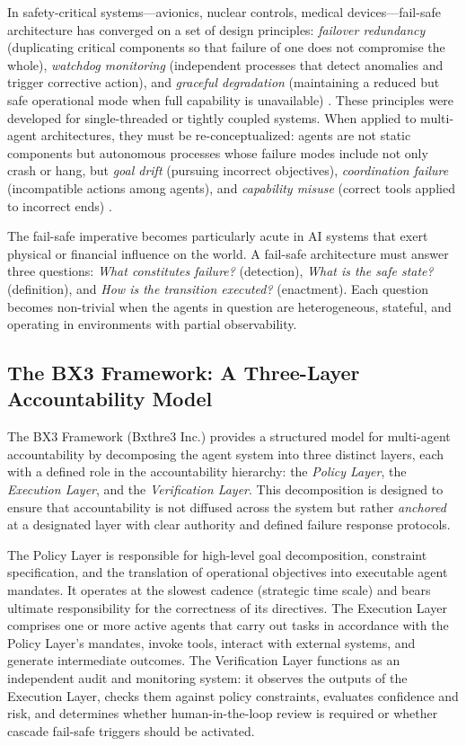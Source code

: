 In safety-critical systems—avionics, nuclear controls, medical devices—fail-safe architecture has converged on a set of design principles: \emph{failover redundancy} (duplicating critical components so that failure of one does not compromise the whole), \emph{watchdog monitoring} (independent processes that detect anomalies and trigger corrective action), and \emph{graceful degradation} (maintaining a reduced but safe operational mode when full capability is unavailable) \cite{wiener1948}. These principles were developed for single-threaded or tightly coupled systems. When applied to multi-agent architectures, they must be re-conceptualized: agents are not static components but autonomous processes whose failure modes include not only crash or hang, but \emph{goal drift} (pursuing incorrect objectives), \emph{coordination failure} (incompatible actions among agents), and \emph{capability misuse} (correct tools applied to incorrect ends) \cite{bansal2019}.

The fail-safe imperative becomes particularly acute in AI systems that exert physical or financial influence on the world. A fail-safe architecture must answer three questions: \emph{What constitutes failure?} (detection), \emph{What is the safe state?} (definition), and \emph{How is the transition executed?} (enactment). Each question becomes non-trivial when the agents in question are heterogeneous, stateful, and operating in environments with partial observability.

\subsection{The BX3 Framework: A Three-Layer Accountability Model}

The BX3 Framework (Bxthre3 Inc.) provides a structured model for multi-agent accountability by decomposing the agent system into three distinct layers, each with a defined role in the accountability hierarchy: the \emph{Policy Layer}, the \emph{Execution Layer}, and the \emph{Verification Layer}. This decomposition is designed to ensure that accountability is not diffused across the system but rather \emph{anchored} at a designated layer with clear authority and defined failure response protocols.

The Policy Layer is responsible for high-level goal decomposition, constraint specification, and the translation of operational objectives into executable agent mandates. It operates at the slowest cadence (strategic time scale) and bears ultimate responsibility for the correctness of its directives. The Execution Layer comprises one or more active agents that carry out tasks in accordance with the Policy Layer's mandates, invoke tools, interact with external systems, and generate intermediate outcomes. The Verification Layer functions as an independent audit and monitoring system: it observes the outputs of the Execution Layer, checks them against policy constraints, evaluates confidence and risk, and determines whether human-in-the-loop review is required or whether cascade fail-safe triggers should be activated.

